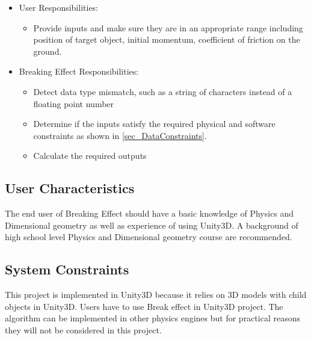 \documentclass[12pt]{article}
\newcommand{\progname}{Breaking Effect} %
\begin{document}
	\begin{itemize}
		\item User Responsibilities:
		\begin{itemize}
			\item Provide inputs and make sure they are in an appropriate range including position of target object, initial momentum, coefficient of friction on the ground. 
		\end{itemize}
		\item \progname{} Responsibilities:
		\begin{itemize}
			\item Detect data type mismatch, such as a string of characters instead of a
			floating point number
			\item Determine if the inputs satisfy the required physical and software constraints as shown in \ref{sec_DataConstraints}.​ 
			\item Calculate the required outputs
		\end{itemize}
	\end{itemize}
	
	\subsection{User Characteristics} \label{SecUserCharacteristics}
	
	The end user of \progname{} should have a basic knowledge of Physics and Dimensional geometry as well as experience of using Unity3D. A background of high school level Physics and Dimensional geometry course are recommended. 
	
	\subsection{System Constraints}
	
	This project is implemented in Unity3D because it relies on 3D models with child objects in Unity3D. Users have to use Break effect in Unity3D project. The algorithm can be implemented in other physics engines but for practical reasons they will not be considered in this project.  
	
\end{document}
